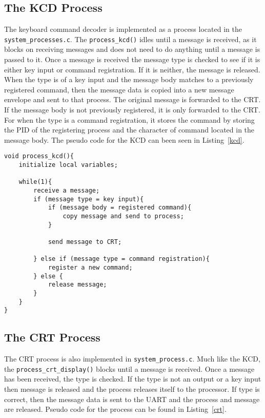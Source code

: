 \documentclass[oneside]{article}
\begin{document}
\subsection*{The KCD Process}
The keyboard command decoder is implemented as a process located in the
\texttt{system\_processes.c}. The \texttt{process\_kcd()} idles until a message
is received, as it blocks on receiving messages and does not need to do
anything until a message is passed to it. Once a message is received the
message type is checked to see if it is either key input or command
registration. If it is neither, the message is released. When the type is of a key
input and the message body matches to a previously registered command, then the
message data is copied into a new message envelope and sent to that process. The 
original message is forwarded to the CRT. If the message body is not
previously registered, it is only forwarded to the CRT. For when the type is a
command registration, it stores the command by storing the PID of the
registering process and the character of command located in the message body.
The pseudo code for the KCD can been seen in Listing~\ref{kcd}. 

\begin{lstlisting}
void process_kcd(){
    initialize local variables;

    while(1){
        receive a message;
        if (message type = key input){
            if (message body = registered command){
                copy message and send to process;
            }
        
            send message to CRT;    

        } else if (message type = command registration){
            register a new command;
        } else {
            release message;
        }
    }
}
\end{lstlisting}

\subsection*{The CRT Process}
The CRT process is also implemented in \texttt{system\_process.c}. Much like
the KCD, the \texttt{process\_crt\_display()} blocks until a message is
received. Once a message has been received, the type is checked. If the type is
not an output or a key input then message is released and the process releases
itself to the processor. If type is correct, then the message data is sent to
the UART and the process and message are released. Pseudo code for the process
can be found in Listing~\ref{crt}.
\end{document}
